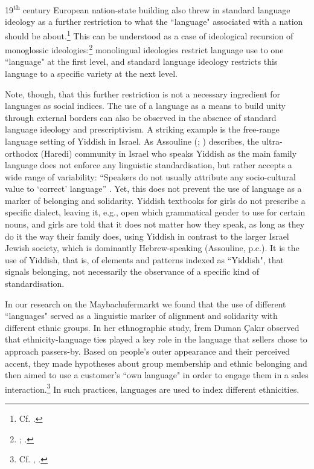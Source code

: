 19\textsuperscript{th} century European nation-state building also threw in standard language ideology as a further restriction to what the “language" associated with a nation should be about.\footnote{Cf. \citet{HüningEtAl2012}.} This can be understood as a case of ideological recursion of monoglossic ideologies:\footnote{\citet{IrvineGal2000}; \citet{Fuller2018}.} monolingual ideologies restrict language use to one “language" at the first level, and standard language ideology restricts this language to a specific variety at the next level.

\largerpage[-1]
Note, though, that this further restriction is not a necessary ingredient for languages as social indices. The use of a language as a means to build unity through external borders can also be observed in the absence of standard language ideology and prescriptivism. A striking example is the free-range language setting of Yiddish in Israel. As Assouline (\citeyear[Ch.1.4.1]{Assouline2017}; \citeyear{Assouline2021}) describes, the ultra-orthodox (Haredi) community in Israel who speaks Yiddish as the main family language does not enforce any linguistic standardisation, but rather accepts a wide range of variability: “Speakers do not usually attribute any socio-cultural value to ‘correct’ language” \citep[18]{Assouline2017}. Yet, this does not prevent the use of language as a marker of belonging and solidarity. Yiddish textbooks for girls do not prescribe a specific dialect, leaving it, e.g., open which grammatical gender to use for certain nouns, and girls are told that it does not matter how they speak, as long as they do it the way their family does, using Yiddish in contrast to the larger Israel Jewish society, which is dominantly Hebrew-speaking (Assouline, p.c.). It is the use of Yiddish, that is, of elements and patterns indexed as “Yiddish", that signals belonging, not necessarily the observance of a specific kind of standardisation.

In our research on the Maybachufermarkt we found that the use of different “languages" served as a linguistic marker of alignment and solidarity with different ethnic groups. In her ethnographic study, İrem Duman Çakır observed that ethnicity-language ties played a key role in the language that sellers chose to approach passers-by. Based on people’s outer appearance and their perceived accent, they made hypotheses about group membership and ethnic belonging and then aimed to use a customer’s “own language" in order to engage them in a sales interaction.\footnote{Cf. \citet{Duman2019}, \citet{SchulteDuman2019}.} In such practices, languages are used to index different ethnicities.

